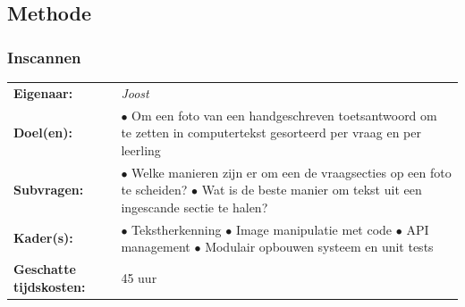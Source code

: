 \documentclass[12pt]{article}
\begin{document}
\pagebreak

\subsection{Methode}

\subsubsection{Inscannen}
\begin{tabularx}{\linewidth}{@{}ll}
    \textbf{Eigenaar: } & \textit{Joost} \\
    \textbf{Doel(en): } & 
        \makecell[tl]{
            $\bullet$  Om een foto van een handgeschreven toetsantwoord om te zetten\\ in computertekst gesorteerd per vraag en per leerling\\
        } \\
    \textbf{Subvragen: } & 
        \makecell[tl]{
            $\bullet$ Welke manieren zijn er om een de vraagsecties op een foto te scheiden? \\
            $\bullet$ Wat is de beste manier om tekst uit een ingescande sectie te halen? \\
        }\\
    \textbf{Kader(s): } & 
        \makecell[tl]{
            $\bullet$ Tekstherkenning\\
            $\bullet$ Image manipulatie met code\\
            $\bullet$ API management\\
            $\bullet$ Modulair opbouwen systeem en unit tests\\
        }\\
    \parbox[t]{3cm}{\raggedright\textbf{Geschatte  tijdskosten:} } & 45 uur \\
\end{tabularx}
\end{document}
